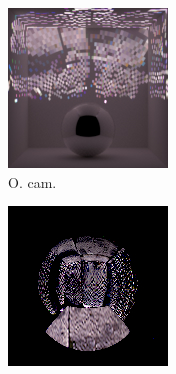 \begin{figure}[]
\begin{subfigure}{\textwidth}
\begin{subfigure}{0.19\textwidth}
            \centering
            \includegraphics[width=\textwidth]{images/04-experiment03/ball/beams/stats_proj.jpg}
            \caption*{O. cam.}
        \end{subfigure}
        \hfill
        \begin{subfigure}{0.19\textwidth}
            \centering
            \includegraphics[width=\textwidth]{images/04-experiment03/ball/beams/pixel_im.jpg}

\end{subfigure}
\end{subfigure}
\end{figure}

